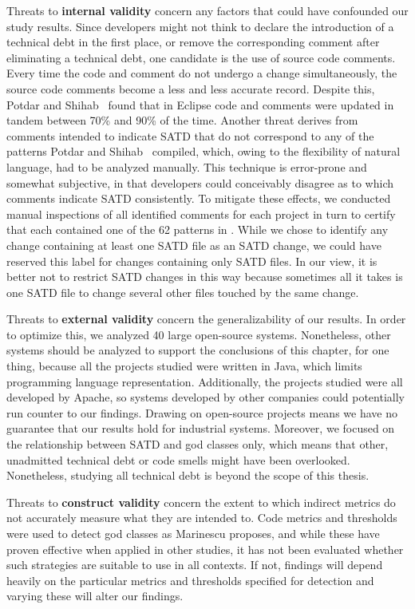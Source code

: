 {Threats to \textbf{internal validity} concern any factors that could have confounded our study results. Since developers might not think to declare the introduction of a technical debt in the first place, or remove the corresponding comment after eliminating a technical debt, one candidate is the use of source code comments. Every time the code and comment do not undergo a change simultaneously, the source code comments become a less and less accurate record. Despite this, Potdar and Shihab~\cite{ICSM_PotdarS14} found that in Eclipse code and comments were updated in tandem between 70\% and 90\% of the time. Another threat derives from comments intended to indicate SATD that do not correspond to any of the patterns Potdar and Shihab~\cite{ICSM_PotdarS14} compiled, which, owing to the flexibility of natural language, had to be analyzed manually. This technique is error-prone and somewhat subjective, in that developers could conceivably disagree as to which comments indicate SATD consistently. To mitigate these effects, we conducted manual inspections of all identified comments for each project in turn to certify that each contained one of the 62 patterns in \cite{ICSM_PotdarS14}. While we chose to identify any change containing at least one SATD file as an SATD change, we could have reserved this label for changes containing only SATD files. In our view, it is better not to restrict SATD changes in this way because sometimes all it takes is one SATD file to change several other files touched by the same change.


Threats to \textbf{external validity} concern the generalizability of our results. In order to optimize this, we analyzed 40 large open-source systems. Nonetheless, other systems should be analyzed to support the conclusions of this chapter, for one thing, because all the projects studied were written in Java, which limits programming language representation. Additionally, the projects studied were all developed by Apache, so systems developed by other companies could potentially run counter to our findings. Drawing on open-source projects means we have no guarantee that our results hold for industrial systems. Moreover, we focused on the relationship between SATD and god classes only, which means that other, unadmitted technical debt or code smells might have been overlooked. Nonetheless, studying all technical debt is beyond the scope of this thesis.

Threats to \textbf{construct validity} concern the extent to which indirect metrics do not accurately measure what they are intended to. Code metrics and thresholds were used to detect god classes as Marinescu \cite{marinescu2004detection} proposes, and while these have proven effective when applied in other studies, it has not been evaluated whether such strategies are suitable to use in all contexts. If not, findings will depend heavily on the particular metrics and thresholds specified for detection and varying these will alter our findings.

}
